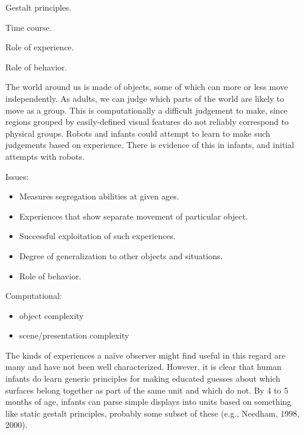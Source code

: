 

Gestalt principles.

Time course.

Role of experience.

Role of behavior.


The world around us is made of objects, some of which can more or less
move independently. As adults, we can judge which parts of the world
are likely to move as a group. This is computationally a difficult
judgement to make, since regions grouped by easily-defined visual
features do not reliably correspond to physical groups. Robots and
infants could attempt to learn to make such judgements based on
experience. There is evidence of this in infants, and initial attempts
with robots.


Issues:

\begin{itemize}

\item Measures segregation abilities at given ages.

\item Experiences that show separate movement of particular object.

\item Successful exploitation of such experiences.

\item Degree of generalization to other objects and situations.

\item Role of behavior.

\end{itemize}

Computational:

\begin{itemize}

\item object complexity

\item scene/presentation complexity

\end{itemize}

The kinds of experiences a na\"{i}ve observer might find
useful in this regard are many and have not been well characterized.
However, it is clear that human infants do learn generic principles
for making educated guesses about which surfaces belong together as
part of the same unit and which do not.  By 4 to 5 months of age,
infants can parse simple displays into units based on something like
static gestalt principles, probably some subset of these (e.g.,
Needham, 1998, 2000).

